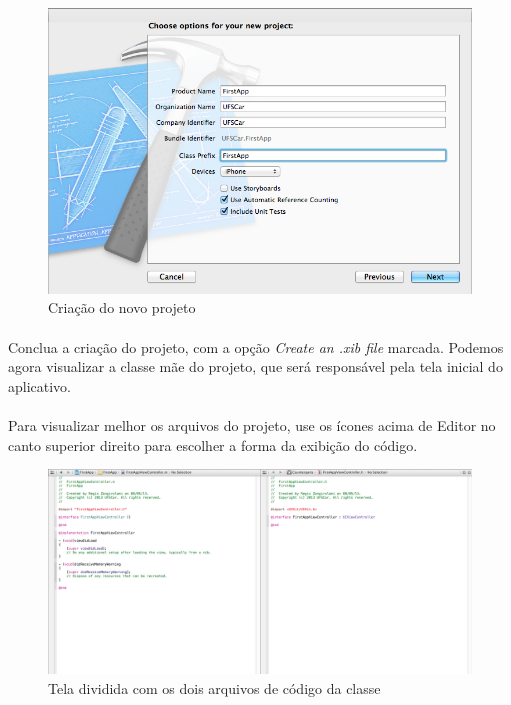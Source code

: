 \documentclass[a4paper,12pt,brazil,doubleside]{book}
\begin{document}
\begin{figure}[h]
  \centering
  \includegraphics[totalheight=0.3\textheight]{../figuras/ios/1/novo_projeto2.png}
  \caption{Criação do novo projeto}
  \label{fig:a}
\end{figure}

\bigskip

\paragraph{}Conclua a criação do projeto, com a opção \emph{Create an .xib file} marcada. Podemos agora visualizar a classe mãe do projeto, que será responsável pela tela inicial do aplicativo.
\paragraph{}Para visualizar melhor os arquivos do projeto, use os ícones acima de Editor no canto superior direito para escolher a forma da exibição do código.

\begin{figure}[h]
  \centering
  \includegraphics[totalheight=0.3\textheight]{../figuras/ios/1/codigo_classe_mh.png}
  \caption{Tela dividida com os dois arquivos de código da classe}
  \label{fig:a}
\end{figure}
\end{document}
